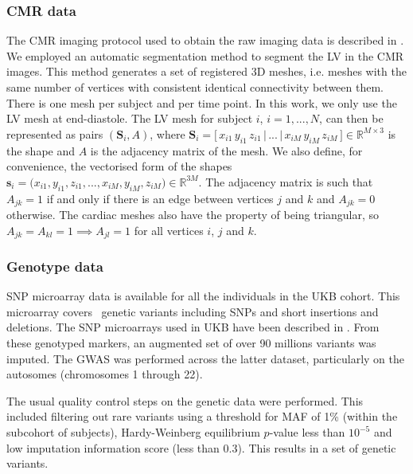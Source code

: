 \subsubsection{CMR data}
The CMR imaging protocol used to obtain the raw imaging data is described in \cite{ref_ukbb_cmr}. 
We employed an automatic segmentation method \cite{ref_rahman} to segment the LV in the CMR images. This method generates a set of registered 3D meshes, i.e. meshes with the same number of vertices with consistent identical connectivity between them. There is one mesh per subject and per time point. In this work, we only use the LV mesh at end-diastole. The LV mesh for subject $i$, $i=1,...,N$, can then be represented as pairs $(\textbf{S}_i, A)$, where $\textbf{S}_i=\big[\,x_{i1}\,y_{i1}\,z_{i1}\,|\,...\,|\,x_{iM}\,y_{iM}\,z_{iM}\,\big]\in \mathbb{R}^{M\times 3}$ is the shape and $A$ is the adjacency matrix of the mesh. We also define, for convenience, the vectorised form of the shapes $\textbf{s}_i=\big(x_{i1},y_{i1},z_{i1},...,x_{iM},y_{iM},z_{iM}\big)\in \mathbb{R}^{3M}$. The adjacency matrix is such that $A_{jk}=1$ if and only if there is an edge between vertices $j$ and $k$ and $A_{jk}=0$ otherwise. The cardiac meshes also have the property of being triangular, so $A_{jk}=A_{kl}=1\implies A_{jl}=1$ for all vertices $i$, $j$ and $k$.

\subsubsection{Genotype data}
SNP microarray data is available for all the individuals in the UKB cohort. This microarray covers \NCALLS\, genetic variants including SNPs and short insertions and deletions. 
The SNP microarrays used in UKB have been described in \cite{ref_ukbb_genetics}. From these genotyped markers, an augmented set of over 90 millions variants was imputed. The GWAS was performed across the latter dataset, particularly on the autosomes (chromosomes 1 through 22). %

The usual quality control steps on the genetic data were performed. This included filtering out rare variants using a threshold for MAF of 1\% (within the subcohort of \NCMRGBR subjects), Hardy-Weinberg equilibrium $p$-value less than $10^{-5}$ and low imputation information score (less than 0.3). This results in a set of \NIMP genetic variants. %

